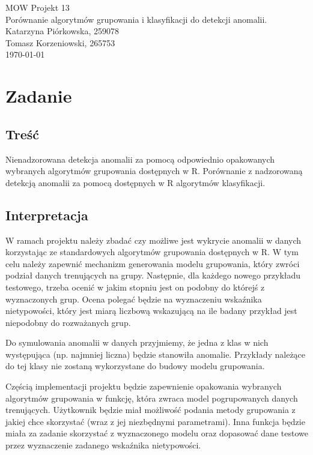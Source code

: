 \documentclass[11pt,a4paper,twoside]{article}
\begin{document}
\begin{center}
\vspace*{3\baselineskip}
{\LARGE{MOW Projekt 13}}
\\
\vspace*{1\baselineskip}
{\large{Porównanie algorytmów grupowania i klasyfikacji do detekcji anomalii.}}
\\
\vspace*{1\baselineskip}
Katarzyna Piórkowska, 259078 \\
Tomasz Korzeniowski, 265753 \\
\vspace*{1\baselineskip}
\today
\end{center}
\section{Zadanie}
\subsection{Treść}
Nienadzorowana detekcja anomalii za pomocą odpowiednio opakowanych wybranych algorytmów grupowania dostępnych w R. Porównanie z nadzorowaną detekcją anomalii za pomocą dostępnych w R algorytmów klasyfikacji.
\subsection{Interpretacja}
W ramach projektu należy zbadać czy możliwe jest wykrycie anomalii w danych korzystając ze standardowych algorytmów grupowania dostępnych w R. W tym celu należy zapewnić mechanizm generowania modelu grupowania, który zwróci podział danych trenujących na grupy. Następnie, dla każdego nowego przykładu testowego, trzeba ocenić w jakim stopniu jest on podobny do którejś z wyznaczonych grup. Ocena polegać będzie na wyznaczeniu wskaźnika nietypowości, który jest miarą liczbową wskazującą na ile badany przykład jest niepodobny do rozważanych grup.

Do symulowania anomalii w danych przyjmiemy, że jedna z klas w nich występująca (np. najmniej liczna) będzie stanowiła anomalie. Przykłady należące do tej klasy nie zostaną wykorzystane do budowy modelu grupowania.

Częścią implementacji projektu będzie zapewnienie opakowania wybranych algorytmów grupowania w funkcję, która zwraca model pogrupowanych danych trenujących. Użytkownik będzie miał możliwość podania metody grupowania z jakiej chce skorzystać (wraz z jej niezbędnymi parametrami). Inna funkcja będzie miała za zadanie skorzystać z wyznaczonego modelu oraz dopasować dane testowe przez wyznaczenie zadanego wskaźnika nietypowości.
\end{document}
